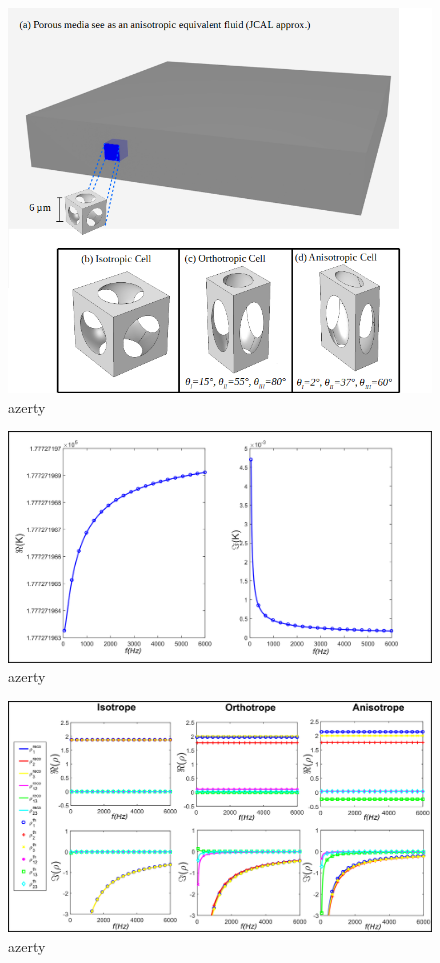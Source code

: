 \documentclass{article}
\begin{document}
    \begin{figure}[ht]
        \centering
        \includegraphics[scale=0.5]{Material_2.png}
        \caption{azerty}
        \label{Material}
    \end{figure}

    \begin{figure}[ht]
        \centering
        \includegraphics[scale=0.3]{Bulk.png}
        \caption{azerty}
        \label{Grph_K}
    \end{figure}

    \begin{figure}[ht]
        \centering
        \includegraphics[scale=0.3]{Density_rot.png}
        \caption{azerty}
        \label{Grph_rho_rot}
    \end{figure}
\end{document}
